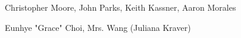 
{
	Christopher Moore,
	John Parks,
	Keith Kassner,
	Aaron Morales
}

{
	Eunhye "Grace" Choi,
	Mrs. Wang (Juliana Kraver)
}